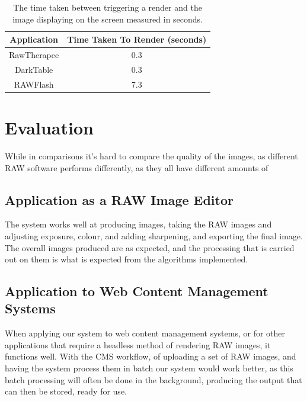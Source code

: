 \documentclass[10pt,a4paper]{article}
\begin{document}
\begin{table}
    \centering
    \begin{tabular}{| c | c |}
        \hline
        Application & Time Taken To Render (seconds)\\
        \hline
        RawTherapee & 0.3\\
        DarkTable & 0.3 \\
        RAWFlash & 7.3 \\
        \hline
    \end{tabular}
    \caption{The time taken between triggering a render and the image displaying on the screen measured in seconds.}
    \label{RenderTimeTable}
\end{table}

\section{Evaluation}
While in comparisons it's hard to compare the quality of the images, as different RAW software performs differently, as they all have different amounts
of 

\subsection{Application as a RAW Image Editor}
The system works well at producing images, taking the RAW images and adjusting exposure, colour, and adding sharpening, and exporting the final image.
The overall images produced are as expected, and the processing that is carried out on them is what is expected from the algorithms implemented.


\subsection{Application to Web Content Management Systems}
When applying our system to web content management systems, or for other applications that require a headless method
of rendering RAW images, it functions well. With the CMS workflow, of uploading a set of RAW images, and having the system
process them in batch our system would work better, as this batch processing will often be done in the background, producing
the output that can then be stored, ready for use.
\end{document}
